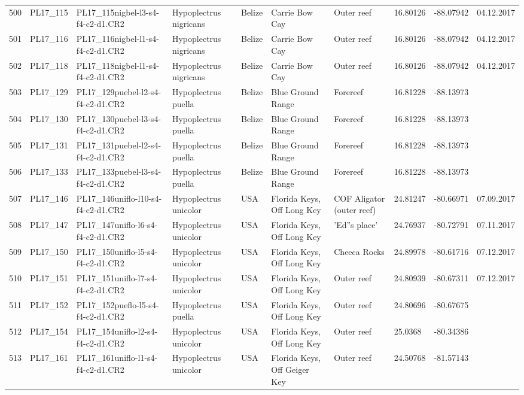 \begin{table}[ht]
\begin{tabular}{rlllllllll}
  500 & PL17\_115 & PL17\_115nigbel-l3-s4-f4-c2-d1.CR2 & Hypoplectrus nigricans & Belize & Carrie Bow Cay & Outer reef & 16.80126 & -88.07942 & 04.12.2017 \\ 
  501 & PL17\_116 & PL17\_116nigbel-l1-s4-f4-c2-d1.CR2 & Hypoplectrus nigricans & Belize & Carrie Bow Cay & Outer reef & 16.80126 & -88.07942 & 04.12.2017 \\ 
  502 & PL17\_118 & PL17\_118nigbel-l1-s4-f4-c2-d1.CR2 & Hypoplectrus nigricans & Belize & Carrie Bow Cay & Outer reef & 16.80126 & -88.07942 & 04.12.2017 \\ 
  503 & PL17\_129 & PL17\_129puebel-l2-s4-f4-c2-d1.CR2 & Hypoplectrus puella & Belize & Blue Ground Range & Forereef & 16.81228 & -88.13973 &  \\ 
  504 & PL17\_130 & PL17\_130puebel-l3-s4-f4-c2-d1.CR2 & Hypoplectrus puella & Belize & Blue Ground Range & Forereef & 16.81228 & -88.13973 &  \\ 
  505 & PL17\_131 & PL17\_131puebel-l2-s4-f4-c2-d1.CR2 & Hypoplectrus puella & Belize & Blue Ground Range & Forereef & 16.81228 & -88.13973 &  \\ 
  506 & PL17\_133 & PL17\_133puebel-l3-s4-f4-c2-d1.CR2 & Hypoplectrus puella & Belize & Blue Ground Range & Forereef & 16.81228 & -88.13973 &  \\ 
  507 & PL17\_146 & PL17\_146uniflo-l10-s4-f4-c2-d1.CR2 & Hypoplectrus unicolor & USA & Florida Keys, Off Long Key & COF Aligator (outer reef) & 24.81247 & -80.66971 & 07.09.2017 \\ 
  508 & PL17\_147 & PL17\_147uniflo-l6-s4-f4-c2-d1.CR2 & Hypoplectrus unicolor & USA & Florida Keys, Off Long Key & 'Ed''s place' & 24.76937 & -80.72791 & 07.11.2017 \\ 
  509 & PL17\_150 & PL17\_150uniflo-l5-s4-f4-c2-d1.CR2 & Hypoplectrus unicolor & USA & Florida Keys, Off Long Key & Cheeca Rocks & 24.89978 & -80.61716 & 07.12.2017 \\ 
  510 & PL17\_151 & PL17\_151uniflo-l7-s4-f4-c2-d1.CR2 & Hypoplectrus unicolor & USA & Florida Keys, Off Long Key & Outer reef & 24.80939 & -80.67311 & 07.12.2017 \\ 
  511 & PL17\_152 & PL17\_152pueflo-l5-s4-f4-c2-d1.CR2 & Hypoplectrus puella & USA & Florida Keys, Off Long Key & Outer reef & 24.80696 & -80.67675 &  \\ 
  512 & PL17\_154 & PL17\_154uniflo-l2-s4-f4-c2-d1.CR2 & Hypoplectrus unicolor & USA & Florida Keys, Off Long Key & Outer reef & 25.0368 & -80.34386 &  \\ 
  513 & PL17\_161 & PL17\_161uniflo-l1-s4-f4-c2-d1.CR2 & Hypoplectrus unicolor & USA & Florida Keys, Off Geiger Key & Outer reef & 24.50768 & -81.57143 &  \\ 

\end{tabular}
\end{table}
